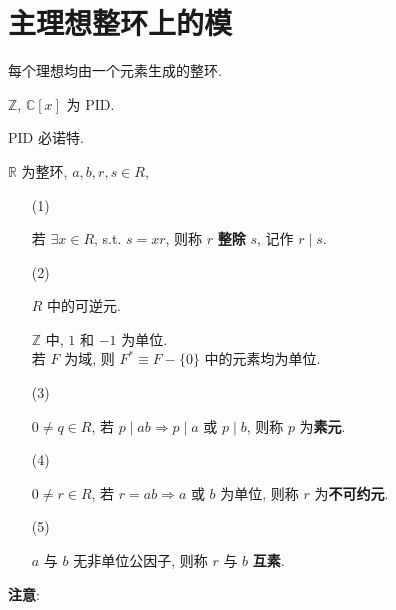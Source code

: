 \documentclass{note}
\begin{document}
\fi
\chapter{主理想整环上的模}
\begin{df}
    每个理想均由一个元素生成的整环.
\end{df}

\begin{eg}
    $\mathbb{Z}$, $\mathbb{C}[x]$ 为 PID.
\end{eg}

PID 必诺特.

$\mathbb{R}$ 为整环, $a,b,r,s\in R$,
\begin{itemize}
    \item[(1)] ~
    \begin{df}[整除]
        若 $\exists x\in R$, s.t. $s=xr$, 则称 $r$ \textbf{整除} $s$, 记作 $r\mid s$.
    \end{df}
    \item[(2)] ~
    \begin{df}[单位]
        $R$ 中的可逆元.
    \end{df}
    \begin{eg}
        $\mathbb{Z}$ 中, $1$ 和 $-1$ 为单位.\\
        若 $F$ 为域, 则 $F^*\equiv F-\{0\}$ 中的元素均为单位.
    \end{eg}
    \item[(3)] ~
    \begin{df}[素元]
        $0\neq q\in R$, 若 $p\mid ab\Longrightarrow p\mid a$ 或 $p\mid b$, 则称 $p$ 为\textbf{素元}.
    \end{df}
    \item[(4)] ~
    \begin{df}[不可约元]
        $0\neq r\in R$, 若 $r=ab\Longrightarrow a$ 或 $b$ 为单位, 则称 $r$ 为\textbf{不可约元}.
    \end{df}
    \item[(5)] ~
    \begin{df}[互素]
        $a$ 与 $b$ 无非单位公因子, 则称 $r$ 与 $b$ \textbf{互素}.
    \end{df}
\end{itemize}
\textbf{注意}:
\end{document}
